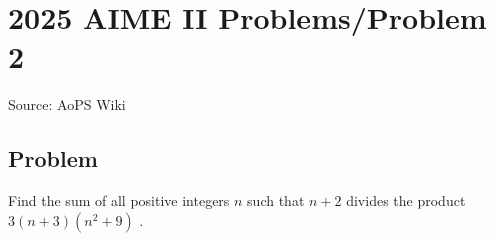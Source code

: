 \documentclass[12pt]{article}
\begin{document}
\section*{{2025 AIME II Problems/Problem 2}}
Source: AoPS Wiki

\subsection*{Problem}
Find the sum of all positive integers $n$ such that $n + 2$ divides the product $3(n + 3)(n^2 + 9)$ .
\end{document}
